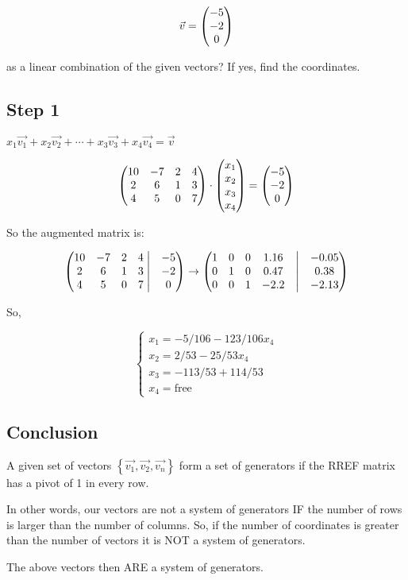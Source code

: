 \documentclass[a4paper]{article}
\begin{document}
\[\vec{v} =  \begin{pmatrix} -5\\-2\\0 \end{pmatrix} \]

as a linear combination of the given vectors? If yes, find the coordinates.

\subsection{Step 1}
$x_1 \vec{v_1} + x_2 \vec{v_2} + \cdots + x_3 \vec{v_3} + x_4 \vec{v_4} = \vec{v}$

\[
	 \begin{pmatrix} 
		10&-7&2&4\\
		2&6&1&3\\
		4&5&0&7
	 \end{pmatrix} 
	\cdot
	 \begin{pmatrix} x_1\\x_2\\x_3\\x_4 \end{pmatrix} 
	=
	 \begin{pmatrix} -5\\-2\\0 \end{pmatrix} 
\]

So the augmented matrix is:

\[
	 \begin{pmatrix} 
		10&-7&2&4 \bigm| & -5 \\
		2&6&1&3 \bigm| & -2 \\
		4&5&0&7 \bigm| & 0 \\
	 \end{pmatrix}  \to
 \begin{pmatrix} 
	1&0&0&1.16& \bigm|& -0.05 \\
	0&1&0&0.47& \bigm|& 0.38 \\
	0&0&1&-2.2& \bigm|& -2.13
	 \end{pmatrix} 
\]

So,

\[
	\begin{cases}
		x_1 = -5/106 - 123/106 x_4 \\
		x_2 = 2/53 - 25/53 x_4 \\
		x_3 = -113/53 + 114/53 \\
		x_4 = \text{free}
	\end{cases}
\]

\subsection{Conclusion}
A given set of vectors $\left\{ \vec{v_1}, \vec{v_2}, \vec{v_n} \right\}$ form a set of generators if the RREF matrix has a pivot of 1 in every row. 

In other words, our vectors are not a system of generators IF the number of rows is larger than the number of columns. So, if the number of coordinates is greater than the number of vectors it is NOT a system of generators.

The above vectors then ARE a system of generators. 
\end{document}
